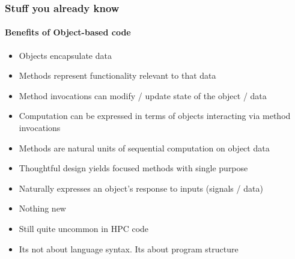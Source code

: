 
\begin{frame}[shrink]
\frametitle{Stuff you already know}
\framesubtitle{Benefits of Object-based code}
    \begin{itemize}
        \item Objects encapsulate data
        \item Methods represent functionality relevant to that data
        \item Method invocations can modify / update state of the object / data
        \item Computation can be expressed in terms of objects interacting via method invocations
    \end{itemize}
    \begin{block}{}
    \begin{itemize}
        \item Methods are natural units of sequential computation on object data
        \item Thoughtful design yields focused methods with single purpose
        \item Naturally expresses an object's response to inputs (signals / data)
    \end{itemize}
    \end{block}
    \begin{itemize}
        \item Nothing new
        \item Still quite uncommon in HPC code
        \item Its not about language syntax. Its about program structure
    \end{itemize}
\end{frame}
